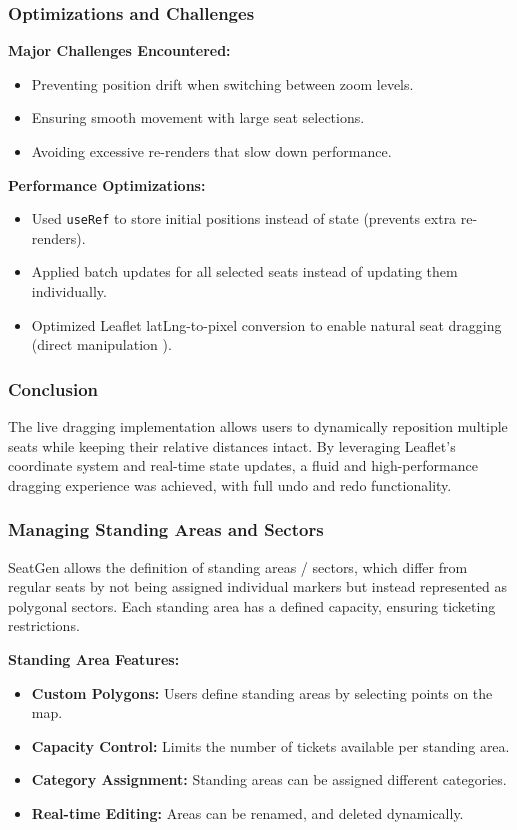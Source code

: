 \subsubsection{Optimizations and Challenges}
\textbf{Major Challenges Encountered:}
\begin{itemize}
    \item Preventing position drift when switching between zoom levels.
    \item Ensuring smooth movement with large seat selections.
    \item Avoiding excessive re-renders that slow down performance.
\end{itemize}

\textbf{Performance Optimizations:}
\begin{itemize}
    \item Used \texttt{useRef} to store initial positions instead of state (prevents extra re-renders).
    \item Applied batch updates for all selected seats instead of updating them individually.
    \item Optimized Leaflet latLng-to-pixel conversion to enable natural seat dragging (direct manipulation \cite{Hutchins01121985}).
\end{itemize}

\subsubsection{Conclusion}
The live dragging implementation allows users to dynamically reposition multiple seats while keeping their relative distances intact. By leveraging Leaflet’s coordinate system and real-time state updates, a fluid and high-performance dragging experience was achieved, with full undo and redo functionality.

\subsubsection{Managing Standing Areas and Sectors}

SeatGen allows the definition of standing areas / sectors, which differ from regular seats by not being assigned individual markers but instead represented as polygonal sectors. Each standing area has a defined capacity, ensuring ticketing restrictions.

\textbf{Standing Area Features:}
\begin{itemize}
    \item \textbf{Custom Polygons:} Users define standing areas by selecting points on the map.
    \item \textbf{Capacity Control:} Limits the number of tickets available per standing area.
    \item \textbf{Category Assignment:} Standing areas can be assigned different categories.
    \item \textbf{Real-time Editing:} Areas can be renamed, and deleted dynamically.
\end{itemize}

